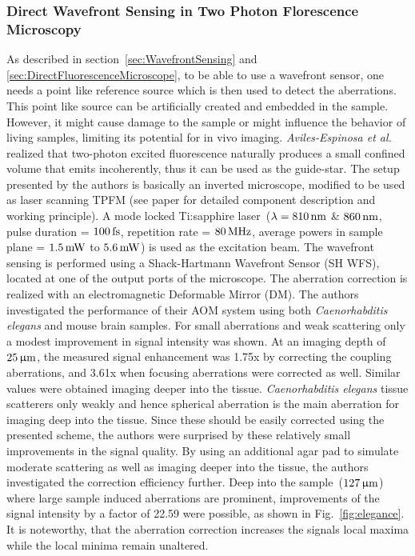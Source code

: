 \subsubsection{Direct Wavefront Sensing in Two Photon Florescence Microscopy}
\label{sec:TPFMDirect}

As described in section~\ref{sec:WavefrontSensing} and \ref{sec:DirectFluorescenceMicroscope}, to be able to use a wavefront sensor, one needs a point like reference source which is then used to detect the aberrations. This point like source can be artificially created and embedded in the sample. However, it might cause damage to the sample or might influence the behavior of living samples, limiting its potential for in vivo imaging. \emph{Aviles-Espinosa et al.} realized that two-photon excited fluorescence naturally produces a small confined volume that emits incoherently, thus it can be used as the guide-star. The setup presented by the authors is basically an inverted microscope, modified to be used as laser scanning TPFM (see paper for detailed component description and working principle). A mode locked Ti:sapphire laser~($\lambda = \unit[810]{nm}$ \& $\unit[860]{nm}$, pulse duration = $\unit[100]{fs}$, repetition rate = $\unit[80]{MHz}$, average powers in sample plane = $\unit[1.5]{mW}$ to $\unit[5.6]{mW}$) is used as the excitation beam. The wavefront sensing is performed using a Shack-Hartmann Wavefront Sensor (SH WFS), located at one of the output ports of the microscope. The aberration correction is realized with an electromagnetic Deformable Mirror (DM). The authors investigated the performance of their AOM system using both \emph{Caenorhabditis elegans} and mouse brain samples. For small aberrations and weak scattering only a modest improvement in signal intensity was shown. At an imaging depth of $\unit[25]{\upmu m}$, the measured signal enhancement was 1.75x by correcting the coupling aberrations, and 3.61x when focusing aberrations were corrected as well. Similar values were obtained imaging deeper into the tissue. \emph{Caenorhabditis elegans} tissue scatterers only weakly and hence spherical aberration is the main aberration for imaging deep into the tissue. Since these should be easily corrected using the presented scheme, the authors were surprised by these relatively small improvements in the signal quality. By using an additional agar pad to simulate moderate scattering as well as imaging deeper into the tissue, the authors investigated the correction efficiency further. Deep into the sample~($\unit[127]{\upmu m}$) where large sample induced aberrations are prominent, improvements of the signal intensity by a factor of 22.59 were possible, as shown in Fig.~\ref{fig:elegance}. It is noteworthy, that the aberration correction increases the signals local maxima while the local minima remain unaltered. 

